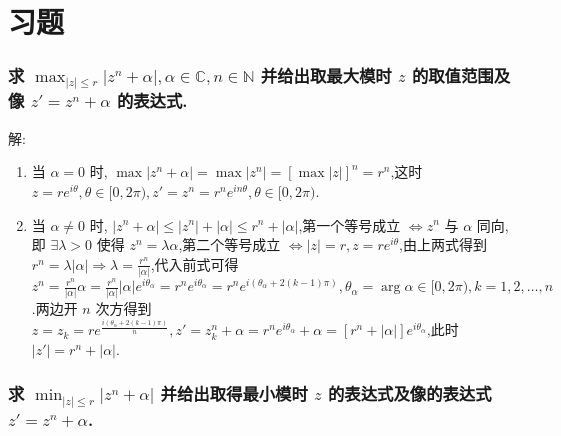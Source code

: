 
\usepackage{../../lectures_preamble}


\section{习题}
\subsubsection{求 $\max_{|z|\le r}|z^{n}+\alpha|,\alpha\in \mathbb{C},n\in \mathbb{N}$ 并给出取最大模时 $z$ 的取值范围及像 $z'=z^{n}+\alpha$ 的表达式.}

解:
\begin{enumerate}
    \item 当 $\alpha=0$ 时, $\max|z^{n}+\alpha|=\max|z^{n}|=[\max|z|]^{n}=r^{n}$,这时 $z=re^{i\theta},\theta\in [0,2\pi),z'=z^{n}=r^{n}e^{in \theta},\theta\in [0,2\pi)$.
    \item 当 $\alpha\ne 0$ 时, $|z^{n}+\alpha|\le |z^{n}|+|\alpha|\le r^{n}+|\alpha|$,第一个等号成立 $\Leftrightarrow z^{n}$ 与 $\alpha$ 同向,即 $\exists \lambda>0$ 使得 $z^{n}=\lambda \alpha$,第二个等号成立 $\Leftrightarrow |z|=r,z=re^{i\theta}$,由上两式得到 $r^{n}=\lambda |\alpha|\Rightarrow \lambda=\frac{r^{n}}{|\alpha|}$,代入前式可得 $z^{n}=\frac{r^{n}}{|\alpha|}\alpha=\frac{r^{n}}{|\alpha|}|\alpha|e^{i\theta_{\alpha}}=r^{n}e^{i\theta_{\alpha}}=r^{n}e^{i\left( \theta_{\alpha}+2\left( k-1 \right) \pi \right) },\theta_{\alpha}=\arg \alpha\in [0,2\pi),k=1,2,\ldots,n$.两边开 $n$ 次方得到 $z=z_{k}=re^{\frac{i\left( \theta_{\alpha}+2\left( k-1 \right) \pi \right) }{n}},z'=z_{k}^{n}+\alpha=r^{n}e^{i\theta_{\alpha}}+\alpha=[r^{n}+|\alpha|]e^{i\theta_{\alpha}}$,此时 $|z'|=r^{n}+|\alpha|$.
\end{enumerate}

\subsubsection{求 $\min_{|z|\le r}|z^{n}+\alpha|$ 并给出取得最小模时 $z$ 的表达式及像的表达式 $z'=z^{n}+\alpha$.}

